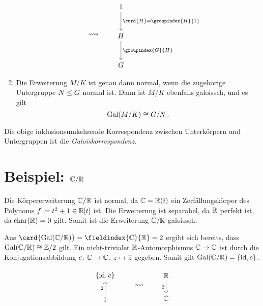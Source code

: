 \begin{theorem}
\begin{enumerate}
\[        \qquad
        \leftrightsquigarrow
        \qquad
        \begin{tikzcd}[row sep = large]
            1
            \arrow{d}[right]{\card{H} = \groupindex{H}{1}}
          \\
            H
            \arrow{d}[right]{\groupindex{G}{H}}
          \\
            G
        \end{tikzcd}
      \]
    \item
      Die Erweiterung $M/K$ ist genau dann normal, wenn die zugehörige Untergruppe $N \mathrel{\leq} G$ normal ist.
      Dann ist $M/K$ ebenfalls galoissch, und es gilt
      \[
              \operatorname{Gal}(M/K)
        \cong G/N \,.
      \]
  \end{enumerate}
\end{theorem}

\begin{definition}
  Die obige inklusionsumkehrende Korrespondenz zwischen Unterkörpern und Untergruppen ist die \emph{Galoiskorrespondenz}.
\end{definition}





\section{Beispiel: \texorpdfstring{$\mathbb{C}/\mathbb{R}$}{C/R}}

Die Körpererweiterung $\mathbb{C}/\mathbb{R}$ ist normal, da $\mathbb{C} = \mathbb{R}(i)$ ein Zerfällungskörper des Polynoms $f \coloneqq t^2 + 1 \in \mathbb{R}[t]$ ist.
Die Erweiterung ist separabel, da $\mathbb{R}$ perfekt ist, da $\operatorname{char}(\mathbb{R}) = 0$ gilt.
Somit ist die Erweiterung $\mathbb{C}/\mathbb{R}$ galoissch.

Aus $\card{\Gal{\Complex/\Real}} = \fieldindex{\Complex}{\Real} = 2$ ergibt sich bereits, dass $\operatorname{Gal}(\mathbb{C}/\mathbb{R}) \cong \mathbb{Z}/2$ gilt.
Ein nicht-trivialer $\mathbb{R}$-Automorphismus $\mathbb{C} \to \mathbb{C}$ ist durch die Konjugationsabbildung $c \colon \mathbb{C} \to \mathbb{C}$, $z \mapsto \overline{z}$ gegeben.
Somit gilt $\operatorname{Gal}(\mathbb{C}/\mathbb{R}) = \{\operatorname{id}, c\}$.

\[
  \begin{tikzcd}
      \{\id, c\}
    \\
      1
      \arrow{u}[left]{2}
  \end{tikzcd}
  \qquad
  \leftrightsquigarrow
  \qquad
  \begin{tikzcd}
      \Real
      \arrow{d}[left]{2}
    \\
      \Complex
  \end{tikzcd}
\]





